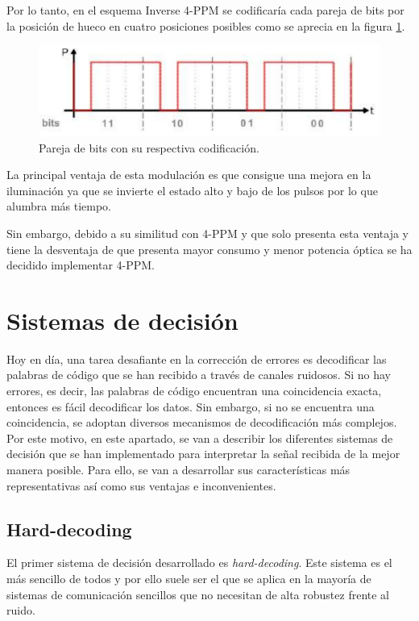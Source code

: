 Por lo tanto, en el esquema Inverse 4-PPM se codificaría cada pareja de bits por la 
posición de hueco en cuatro posiciones posibles como se aprecia en la figura 
\ref{bitsi4ppm}.

\begin{figure}[ht]
    \centering
    \includegraphics[scale=0.5]{./figuras/opcionesI4PPM.png}%
    \caption{\small{Pareja de bits con su respectiva codificación.}}
    \label{bitsi4ppm}%
\end{figure}

La principal ventaja de esta modulación es que consigue una mejora en la iluminación ya que 
se invierte el estado alto y bajo de los pulsos por lo que alumbra más tiempo. 

Sin embargo, debido a su similitud con 4-PPM y que solo presenta esta ventaja y tiene 
la desventaja de que presenta mayor consumo y menor potencia óptica se ha decidido 
implementar 4-PPM.

\section{Sistemas de decisión}
Hoy en día, una tarea desafiante en la corrección de errores es decodificar las palabras 
de código que se han recibido a través de canales ruidosos. Si no hay errores, es decir, 
las palabras de código encuentran una coincidencia exacta, entonces es fácil decodificar 
los datos. Sin embargo, si no se encuentra una coincidencia, se adoptan diversos mecanismos
de decodificación más complejos. Por este motivo,
en este apartado, se van a describir los diferentes sistemas de decisión que se han 
implementado para interpretar 
la señal recibida de la mejor manera posible. Para ello, se van a
desarrollar sus características más representativas así como sus ventajas e inconvenientes.

\subsection{Hard-decoding}
El primer sistema de decisión desarrollado es \textit{hard-decoding}. Este sistema es 
el más sencillo de todos y por ello suele ser el que se aplica en la mayoría de sistemas
de comunicación sencillos que no necesitan de alta robustez frente al ruido.

